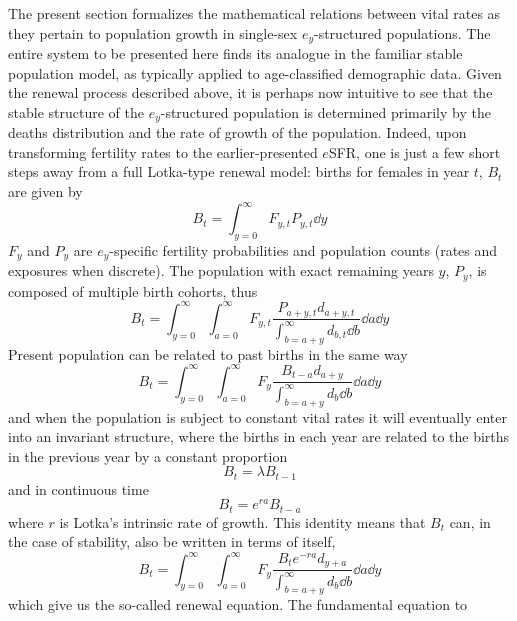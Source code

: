  \FloatBarrier
 \label{sec:ex2sexequation}
The present section formalizes the mathematical relations between vital
rates as they pertain to population growth in single-sex $e_y$-structured
populations. The entire system to be presented here finds its analogue in the
familiar stable population model, as typically applied to age-classified
demographic data. Given the renewal process described above, it is perhaps now
intuitive to see that the stable structure of the $e_y$-structured population is determined
primarily by the deaths distribution and the rate of growth of the
population. Indeed, upon transforming fertility rates to the earlier-presented
$e$SFR, one is just a few short steps away from a full Lotka-type renewal
model: births for females in year $t$, $B_{t}$ are given by
\begin{equation}
B_t = \int_{y=0}^\infty F_{y,t} P_{y,t} \dd y
\end{equation}
$F_y$ and $P_y$ are $e_y$-specific fertility probabilities and population
counts (rates and exposures when discrete). The population with
exact remaining years $y$, $P_y$, is composed of multiple birth cohorts, thus
\begin{equation}
B_t = \int_{y=0}^\infty \int_{a=0}^\infty F_{y,t}
\frac{P_{a+y,t}d_{a+y,t}}{\int_{b=a+y}^\infty d_{b,t} \dd b} \dd a \dd y
\end{equation}
Present population can be related to past
births in the same way
\begin{equation}
B_t = \int_{y=0}^\infty \int_{a=0}^\infty F_y
\frac{B_{t-a}d_{a+y}}{\int_{b=a+y}^\infty d_b \dd b} \dd a \dd y
\end{equation}
and when the population is subject to constant vital rates it will eventually
enter into an invariant structure, where the births in each year are related to
the births in the previous year by a constant proportion
\begin{equation}
B_t = \lambda B_{t-1}
\end{equation}
and in continuous time
\begin{equation}
B_t = e^{ra}B_{t-a}
\end{equation}
where $r$ is Lotka's intrinsic rate of growth. This identity means that $B_t$
can, in the case of stability, also be written in terms of itself,
\begin{equation}
\label{eq:exrenewal1sex}
B_t = \int_{y=0}^\infty \int_{a=0}^\infty F_y
\frac{B_{t}e^{-ra}d_{y+a}}{\int_{b=a+y}^\infty d_b \dd b} \dd a \dd y
\end{equation}
which give us the so-called renewal equation. The fundamental equation to
